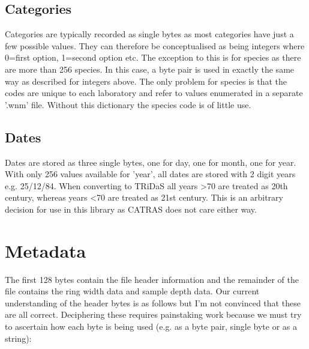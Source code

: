 \subsection{Categories}

Categories are typically recorded as single bytes as most categories have just a few possible values. They can therefore be conceptualised as being integers where 0=first option, 1=second option etc. The exception to this is for species as there are more than 256 species. In this case, a byte pair is used in exactly the same way as described for integers above. The only problem for species is that the codes are unique to each laboratory and refer to values enumerated in a separate '.wnm' file. Without this dictionary the species code is of little use. 

\subsection{Dates}

Dates are stored as three single bytes, one for day, one for month, one for year. With only 256 values available for 'year', all dates are stored with 2 digit years e.g. 25/12/84. When converting to TRiDaS all years >70 are treated as 20th century, whereas years <70 are treated as 21st century. This is an arbitrary decision for use in this library as CATRAS does not care either way. 

\section{Metadata}

The first 128 bytes contain the file header information and the remainder of the file contains the ring width data and sample depth data. Our current understanding of the header bytes is as follows but I'm not convinced that these are all correct. Deciphering these requires painstaking work because we must try to ascertain how each byte is being used (e.g. as a byte pair, single byte or as a string): 

